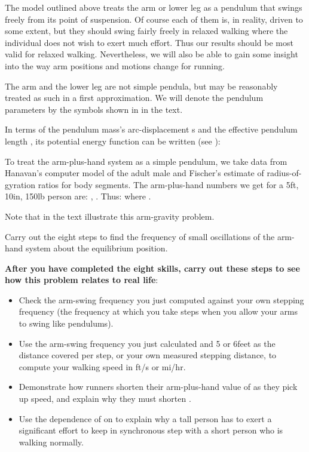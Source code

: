{\begin{one-digit-list}
The model outlined above treats the arm or lower leg as a pendulum that
swings freely from its point of suspension.
Of course each of them is, in reality, driven to some extent, but they should
swing fairly freely in relaxed walking where the individual does not wish to
exert much effort.
Thus our results should be most valid for relaxed walking.
Nevertheless, we will also be able to gain some insight into the way arm
positions and motions change for running.

The arm and the lower leg are not simple pendula, but may be reasonably
treated as such in a first approximation.
We will denote the pendulum parameters by the symbols shown in 
in the text.

In terms of the pendulum mass's arc-displacement s and the effective
pendulum length \m{\ell}, its potential energy function can be written (see
):  
%
%

To treat the arm-plus-hand system as a simple pendulum, we take data from
Hanavan's computer model of the adult male and Fischer's estimate of
radius-of-gyration ratios for body segments.
%
%
The arm-plus-hand numbers we get for a 5\unit{ft},\,10\unit{in}, 150\unit{lb} person are:
, .
Thus:  where .

Note that  in the text illustrate this arm-gravity problem.

Carry out the eight steps to find the frequency of small oscillations of the
arm-hand system about the equilibrium position.

{\bf After you have completed the eight skills, carry out these steps
to see how this problem relates to real life}:
\begin{itemize}
\item Check the arm-swing frequency you just computed against your
own stepping frequency (the frequency at which you take steps when you allow
your arms to swing like pendulums).
\item Use the arm-swing frequency you just calculated and 5 or 6\unit{feet} as the
distance covered per step, or your own measured stepping distance,
to compute your walking speed in \unit{ft/s} or \unit{mi/hr}.
\item Demonstrate how runners shorten their arm-plus-hand value of \m{\ell} as they
pick up speed, and explain why they must shorten \m{\ell}.
\item Use the dependence of \m{\nu} on \m{\ell} to explain why a tall person has to exert
a significant effort to keep in synchronous step with a short person who is
walking normally.
\end{itemize}


\end{one-digit-list}}
